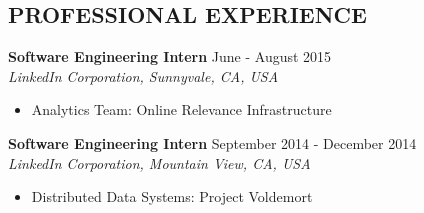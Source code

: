 \documentclass[10pt]{res} %
\begin{document}
\begin{resume}

\section{PROFESSIONAL EXPERIENCE} 

\vspace{0.2in} %

\textbf{Software Engineering Intern} \hfill June - August 2015 \\
{\sl LinkedIn Corporation, Sunnyvale, CA, USA }
\begin{itemize}  %
    \item Analytics Team: Online Relevance Infrastructure
\end{itemize}

\textbf{Software Engineering Intern} \hfill September 2014 - December 2014 \\[2pt]
{\sl LinkedIn Corporation, Mountain View, CA, USA} 
\begin{itemize}  %
    \item Distributed Data Systems: Project Voldemort
\end{itemize}
 

\end{resume}
\end{document}
